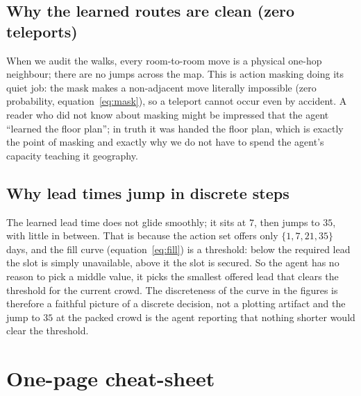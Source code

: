 \documentclass[11pt]{article}
\newcommand{\why}[1]{\textcolor{inkblue}{#1}}
\begin{document}
\subsection{Why the learned routes are clean (zero teleports)}

When we audit the walks, every room-to-room move is a physical one-hop neighbour; there are
no jumps across the map. \why{This is action masking doing its quiet job: the mask makes a
non-adjacent move literally impossible (zero probability, equation~\eqref{eq:mask}), so a
teleport cannot occur even by accident.} A reader who did not know about masking might be
impressed that the agent ``learned the floor plan''; in truth it was handed the floor plan,
which is exactly the point of masking and exactly why we do not have to spend the agent's
capacity teaching it geography.

\subsection{Why lead times jump in discrete steps}

The learned lead time does not glide smoothly; it sits at $7$, then jumps to $35$, with
little in between. \why{That is because the action set offers only $\{1, 7, 21, 35\}$ days,
and the fill curve (equation~\eqref{eq:fill}) is a threshold: below the required lead the
slot is simply unavailable, above it the slot is secured. So the agent has no reason to pick
a middle value, it picks the smallest offered lead that clears the threshold for the current
crowd.} The discreteness of the curve in the figures is therefore a faithful picture of a
discrete decision, not a plotting artifact and the jump to $35$ at the packed crowd is the
agent reporting that nothing shorter would clear the threshold.

\section{One-page cheat-sheet}
\end{document}
